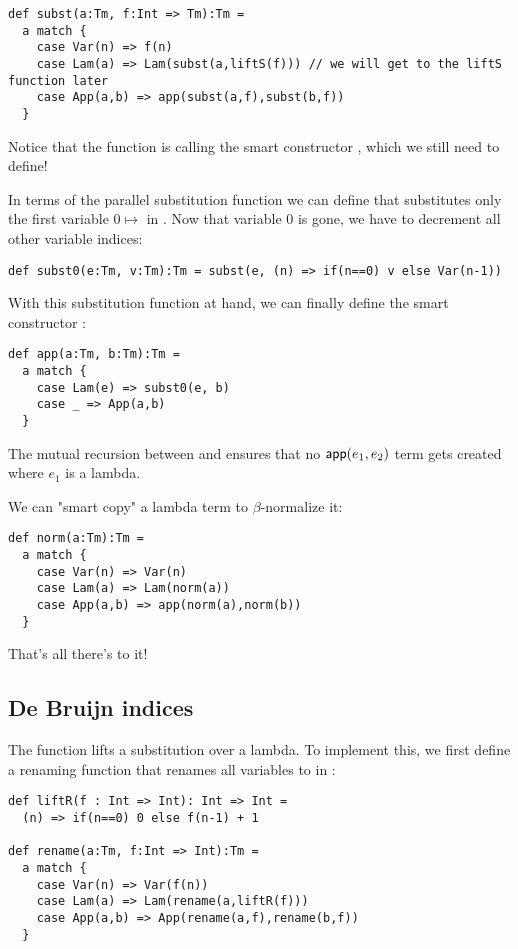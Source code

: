 \begin{lstlisting}
def subst(a:Tm, f:Int => Tm):Tm =
  a match {
    case Var(n) => f(n)
    case Lam(a) => Lam(subst(a,liftS(f))) // we will get to the liftS function later
    case App(a,b) => app(subst(a,f),subst(b,f))
  }
\end{lstlisting}

Notice that the  function is calling the smart constructor , which we still need to define!

In terms of the parallel substitution function  we can define  that substitutes only the first variable $0 \mapsto$  in .
Now that variable $0$ is gone, we have to decrement all other variable indices:

\begin{lstlisting}
def subst0(e:Tm, v:Tm):Tm = subst(e, (n) => if(n==0) v else Var(n-1))
\end{lstlisting}

With this substitution function at hand, we can finally define the smart constructor :

\begin{lstlisting}
def app(a:Tm, b:Tm):Tm =
  a match {
    case Lam(e) => subst0(e, b)
    case _ => App(a,b)
  }
\end{lstlisting}

The mutual recursion between  and  ensures that no $\mathsf{app}(e_1,e_2)$ term gets created where $e_1$ is a lambda.

We can "smart copy" a lambda term to $\beta$-normalize it:

\begin{lstlisting}
def norm(a:Tm):Tm =
  a match {
    case Var(n) => Var(n)
    case Lam(a) => Lam(norm(a))
    case App(a,b) => app(norm(a),norm(b))
  }
\end{lstlisting}

That's all there's to it!

\subsection{De Bruijn indices}

The  function lifts a substitution over a lambda.
To implement this, we first define a renaming function  that renames all variables  to  in :

\begin{lstlisting}
def liftR(f : Int => Int): Int => Int =
  (n) => if(n==0) 0 else f(n-1) + 1

def rename(a:Tm, f:Int => Int):Tm =
  a match {
    case Var(n) => Var(f(n))
    case Lam(a) => Lam(rename(a,liftR(f)))
    case App(a,b) => App(rename(a,f),rename(b,f))
  }
\end{lstlisting}

